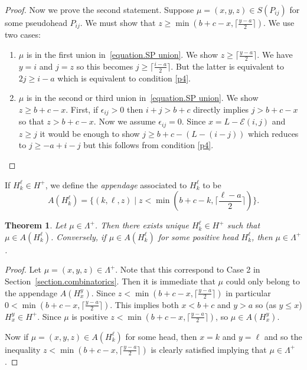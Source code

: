 \documentclass[11pt,reqno]{amsart}
\newcommand{\defn}[1]{{\color{darkred}\emph{#1}}} %
\newtheorem{theorem}{Theorem}[section]
\theoremstyle{definition}
\numberwithin{equation}{section}
\begin{document}
\begin{proof}
Now we prove the second statement.  Suppose $\mu=(x,y,z) \in S(P_{ij})$ for some pseudohead $P_{ij}$.  We must show 
that $z \geqslant \min(b+c-x,\lceil \frac{y-a}{2}\rceil)$.  We use two cases:
\begin{enumerate}
\item $\mu$ is in the first union in~\eqref{equation.SP union}. We show $z \geqslant \lceil \frac{y-a}{2}\rceil$. We have 
$y=i$ and $j=z$ so this becomes $j \geqslant \lceil \frac{i-a}{2}\rceil$.  But the latter is equivalent to $2j \geqslant i-a$ 
which is equivalent to condition \eqref{p4}.
\item $\mu$ is in the second or third union in~\eqref{equation.SP union}. We show $z \geqslant b+c-x$. First, if 
$\epsilon_{ij}>0$ then $i+j>b+c$ directly implies $j>b+c-x$ so that $z>b+c-x$. Now we assume $\epsilon_{ij}=0$. 
Since $x=L-\mathcal{E}(i,j)$ and $z\geqslant j$ it would be enough to show $j \geqslant b+c-(L-(i-j))$ which reduces 
to $j\geqslant -a+i-j$ but this follows from condition \eqref{p4}.
\end{enumerate}
\end{proof}

If $H_k^\ell \in H^+$, we define the \defn{appendage} associated to $H_k^\ell$ to be
\[
	A(H_k^\ell)=\{(k,\ell,z)\mid z < \min(b+c-k,\lceil \frac{\ell-a}{2}\rceil)\}.
\]

\begin{theorem} \label{pos}
Let $\mu \in \Lambda^+$. Then there exists unique  $H_k^\ell \in H^+$ such that $\mu \in A(H_k^\ell)$.  
Conversely, if $\mu \in A(H_k^\ell)$ for some positive head $H_k^\ell$, then $\mu \in \Lambda^+$.
\end{theorem}

\begin{proof}
Let $\mu=(x,y,z) \in \Lambda^+$.  Note that this correspond to Case 2 in Section~\ref{section.combinatorics}.
Then it is immediate that $\mu$ could only belong to the appendage $A(H_x^y)$.  
Since $z < \min(b+c-x,\lceil \frac{y-a}{2}\rceil)$ in particular $0 < \min(b+c-x,\lceil \frac{y-a}{2}\rceil)$.  This implies both 
$x <b+c$ and $y>a$ so (as $y \leqslant x$) $H_x^y \in H^+$.  Since $\mu$ is positive $z < \min(b+c-x,\lceil \frac{y-a}{2}\rceil)$,
so $\mu \in A(H_x^y)$.  

Now if $\mu=(x,y,z) \in A(H_k^\ell)$ for some head, then $x=k$ and $y=\ell$ and so the inequality 
$z < \min(b+c-x,\lceil \frac{y-a}{2}\rceil)$ is clearly satisfied implying that $\mu \in \Lambda^+$.
\end{proof}
\end{document}
